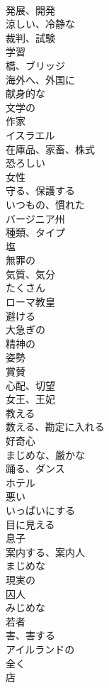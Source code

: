 \documentclass[8pt]{extreport}
\begin{document}
\begin{CJK}{UTF8}{min}
\\	発展、開発	
\\	涼しい、冷静な	
\\	裁判、試験	
\\	学習	
\\	橋、ブリッジ	
\\	海外へ、外国に	
\\	献身的な	
\\	文学の	
\\	作家	
\\	イスラエル	
\\	在庫品、家畜、株式	
\\	恐ろしい	
\\	女性	
\\	守る、保護する	
\\	いつもの、慣れた	
\\	バージニア州	
\\	種類、タイプ	
\\	塩	
\\	無罪の	
\\	気質、気分	
\\	たくさん	
\\	ローマ教皇	
\\	避ける	
\\	大急ぎの	
\\	精神の	
\\	姿勢	
\\	賞賛	
\\	心配、切望	
\\	女王、王妃	
\\	教える	
\\	数える、勘定に入れる	
\\	好奇心	
\\	まじめな、厳かな	
\\	踊る、ダンス	
\\	ホテル	
\\	悪い	
\\	いっぱいにする	
\\	目に見える	
\\	息子	
\\	案内する、案内人	
\\	まじめな	
\\	現実の	
\\	囚人	
\\	みじめな	
\\	若者	
\\	害、害する	
\\	アイルランドの	
\\	全く	
\\	店	

\end{CJK}
\end{document}
